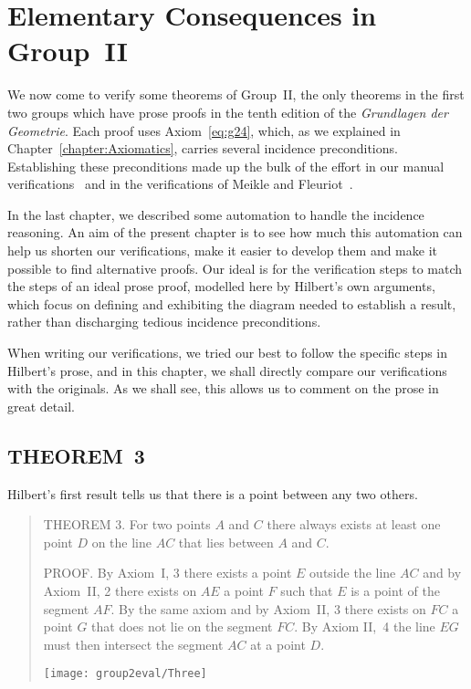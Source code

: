 \chapter{Elementary Consequences in Group~II}\label{chapter:Group2Eval}
We now come to verify some theorems of Group~II, the only theorems in the first two groups which have prose proofs in the tenth edition of the \emph{Grundlagen der Geometrie}. Each proof uses Axiom~\ref{eq:g24}, which, as we explained in Chapter~\ref{chapter:Axiomatics}, carries several incidence preconditions. Establishing these preconditions made up the bulk of the effort in our manual verifications~\cite{ScottMScThesis} and in the verifications of Meikle and Fleuriot~\cite{MeikleFleuriotFormalizingHilbert}.

In the last chapter, we described some automation to handle the incidence reasoning.
An aim of the present chapter is to see how much this automation can help us shorten
our verifications, make it easier to develop them and make it possible to find alternative proofs. Our ideal is for the verification steps to match the steps of an ideal prose proof, modelled here by Hilbert's own arguments, which focus on defining and exhibiting the diagram needed to establish a result, rather than discharging tedious incidence preconditions.

When writing our verifications, we tried our best to follow the specific steps in Hilbert's prose, and in this chapter, we shall directly compare our verifications with the originals. As we shall see, this allows us to comment on the prose in great detail.

\section{THEOREM~3}\label{sec:Theorem3}
Hilbert's first result tells us that there is a point between any two others.

\begin{quotation}
THEOREM 3. For two points $A$ and $C$ there always exists at least one point $D$ on the line $AC$ that lies between $A$ and $C$.

PROOF. By Axiom~I, 3 there exists a point $E$ outside the line $AC$ and by Axiom~II, 2 there exists on $AE$ a point $F$ such that $E$ is a point of the segment $AF$. By the same axiom and by Axiom~II, 3 there exists on $FC$ a point $G$ that does not lie on the segment $FC$. By Axiom II,~4 the line $EG$ must then intersect the segment $AC$ at a point $D$.

\vspace{0.5cm}
\centering\texttt{[image: group2eval/Three]}
\end{quotation}

